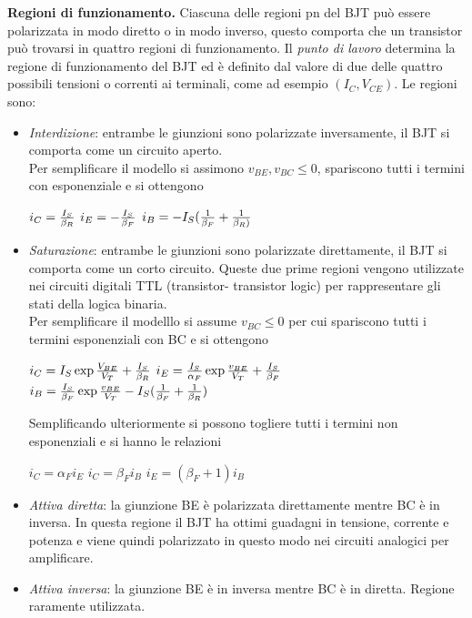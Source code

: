 \documentclass[a4paper,portrait,12pt]{article}
\theoremstyle{definition}
\begin{document}
\textbf{Regioni di funzionamento.} Ciascuna delle regioni pn del BJT può essere polarizzata in modo diretto 
o in modo inverso, questo comporta che un transistor può trovarsi in quattro regioni di funzionamento.
Il \textit{punto di lavoro} determina la regione di funzionamento del BJT ed è definito dal valore di due
delle quattro possibili tensioni o correnti ai terminali, come ad esempio $(I_C,V_{CE})$. Le regioni sono:
\begin{itemize}
\item \textit{Interdizione}: entrambe le giunzioni sono polarizzate inversamente, il BJT si comporta come 
	un circuito aperto.\\ 
	Per semplificare il modello si assimono $v_{BE},v_{BC} \le 0$, spariscono tutti i termini con 
	esponenziale e si ottengono
	\begin{center}
	$i_C = {I_S \over \beta_R}$ \quad $i_E = -{I_S \over \beta_F}$ \quad 
	$i_B = -I_S({1 \over \beta_F} + {1 \over \beta_R)}$
	\end{center}
\item \textit{Saturazione}: entrambe le giunzioni sono polarizzate direttamente, il BJT si comporta come 
	un corto circuito. Queste due prime regioni vengono utilizzate nei circuiti digitali TTL (transistor-
	transistor logic) per rappresentare gli stati della logica binaria.\\
	Per semplificare il modelllo si assume $v_{BC} \le 0$ per cui spariscono tutti i termini 
	esponenziali con BC e si ottengono
	\begin{center}
	$i_C = I_S \exp{{V_{BE}\over V_T}} + {I_S \over \beta_R}$ \quad 
	$i_E = {I_S \over \alpha_F} \exp{{v_{BE} \over V_T}} + {I_S \over \beta_F}$ \quad
	$i_B = {I_S \over \beta_F} \exp{{v_{BE} \over V_T}} -I_S({1\over \beta_F}+{1\over \beta_R})$
	\end{center}
	Semplificando ulteriormente si possono togliere tutti i termini non esponenziali e si hanno le 
	relazioni
	\begin{center}
	$i_C = \alpha_F i_E$ \quad $i_C = \beta_F i_B$ \quad $i_E = (\beta_F + 1)i_B$
	\end{center}
\item \textit{Attiva diretta}: la giunzione BE è polarizzata direttamente mentre BC è in inversa. In questa
	regione il BJT ha ottimi guadagni in tensione, corrente e potenza e viene quindi polarizzato in
	questo modo nei circuiti analogici per amplificare.
\item \textit{Attiva inversa}: la giunzione BE è in inversa mentre BC è in diretta. Regione raramente 
	utilizzata. 
\end{itemize}
\bigskip
\end{document}
